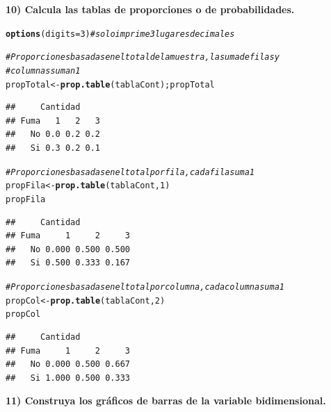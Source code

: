 \documentclass[12pt,letterpaper]{article}\usepackage[]{graphicx}\usepackage[]{color}
\makeatletter
\newcommand{\hlnum}[1]{\textcolor[rgb]{0.686,0.059,0.569}{#1}}%
\newcommand{\hlcom}[1]{\textcolor[rgb]{0.678,0.584,0.686}{\textit{#1}}}%
\newcommand{\hlstd}[1]{\textcolor[rgb]{0.345,0.345,0.345}{#1}}%
\newcommand{\hlkwb}[1]{\textcolor[rgb]{0.69,0.353,0.396}{#1}}%
\newcommand{\hlkwc}[1]{\textcolor[rgb]{0.333,0.667,0.333}{#1}}%
\newcommand{\hlkwd}[1]{\textcolor[rgb]{0.737,0.353,0.396}{\textbf{#1}}}%
\newenvironment{kframe}{%
 \def\at@end@of@kframe{}%
 \ifinner\ifhmode%
  \def\at@end@of@kframe{\end{minipage}}%
  \begin{minipage}{\columnwidth}%
 \fi\fi%
 \def\FrameCommand##1{\hskip\@totalleftmargin \hskip-\fboxsep
 \colorbox{shadecolor}{##1}\hskip-\fboxsep
     \hskip-\linewidth \hskip-\@totalleftmargin \hskip\columnwidth}%
 \MakeFramed {\advance\hsize-\width
   \@totalleftmargin\z@ \linewidth\hsize
   \@setminipage}}%
 {\par\unskip\endMakeFramed%
 \at@end@of@kframe}
\newenvironment{knitrout}{}{} %
\makeatother
\begin{document}
\textbf {10) Calcula las tablas de proporciones o de probabilidades.}

\begin{knitrout}
\color{fgcolor}\begin{kframe}
\begin{alltt}
\hlkwd{options}\hlstd{(}\hlkwc{digits}\hlstd{=}\hlnum{3}\hlstd{)} \hlcom{# solo imprime 3 lugares decimales}

\hlcom{# Proporciones basadas en el total de la muestra, la suma de filas y }
\hlcom{# columnas suman 1 }
\hlstd{propTotal} \hlkwb{<-} \hlkwd{prop.table}\hlstd{(tablaCont); propTotal}
\end{alltt}
\begin{verbatim}
##     Cantidad
## Fuma   1   2   3
##   No 0.0 0.2 0.2
##   Si 0.3 0.2 0.1
\end{verbatim}
\begin{alltt}
\hlcom{# Proporciones basadas en el total por fila, cada fila suma 1 }
\hlstd{propFila} \hlkwb{<-} \hlkwd{prop.table}\hlstd{(tablaCont,} \hlnum{1}\hlstd{)}
\hlstd{propFila}
\end{alltt}
\begin{verbatim}
##     Cantidad
## Fuma     1     2     3
##   No 0.000 0.500 0.500
##   Si 0.500 0.333 0.167
\end{verbatim}
\begin{alltt}
\hlcom{# Proporciones basadas en el total por columna, cada columna suma 1 }
\hlstd{propCol} \hlkwb{<-} \hlkwd{prop.table}\hlstd{(tablaCont,} \hlnum{2}\hlstd{)}
\hlstd{propCol}
\end{alltt}
\begin{verbatim}
##     Cantidad
## Fuma     1     2     3
##   No 0.000 0.500 0.667
##   Si 1.000 0.500 0.333
\end{verbatim}
\end{kframe}
\end{knitrout}

\textbf {11) Construya los gr\'aficos de barras de la variable bidimensional.} 
\end{document}
